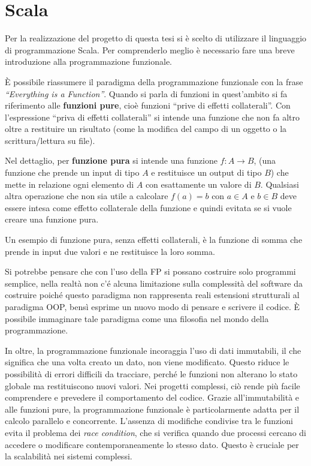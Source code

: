 \documentclass[12pt,a4paper,openright,twoside]{book}
\begin{document}
\section{Scala}

Per la realizzazione del progetto di questa tesi si è scelto di utilizzare il linguaggio di programmazione Scala. Per comprenderlo meglio è necessario fare una breve introduzione alla programmazione funzionale.

È possibile riassumere il paradigma della programmazione funzionale con la frase \textit{``Everything is a Function''}. Quando si parla di funzioni in quest'ambito si fa riferimento alle \textbf{funzioni pure}\cite{Hunt2018}, cioè funzioni ``prive di effetti collaterali''. Con l'espressione ``priva di effetti collaterali'' si intende una funzione che non fa altro oltre a restituire un risultato (come la modifica del campo di un oggetto o la scrittura/lettura su file).

\label{sec:fp}
Nel dettaglio, per \textbf{funzione pura} si intende una funzione $f:A\to B$, (una funzione che prende un input di tipo $A$ e restituisce un output di tipo $B$) che mette in relazione ogni elemento di $A$ con esattamente un valore di $B$. Qualsiasi altra operazione che non sia utile a calcolare $f(a)=b$ con $a\in A$ e $b\in B$ deve essere intesa come effetto collaterale della funzione e quindi evitata se si vuole creare una funzione pura.

Un esempio di funzione pura, senza effetti collaterali, è la funzione di somma che prende in input due valori e ne restituisce la loro somma. 

Si potrebbe pensare che con l'uso della \ac{FP} si possano costruire solo programmi semplice, nella realtà non c'é alcuna limitazione sulla complessità del software da costruire poiché questo paradigma non rappresenta reali estensioni strutturali al paradigma \ac{OOP}, bensì esprime un nuovo modo di pensare e scrivere il codice. È possibile immaginare tale paradigma come una filosofia nel mondo della programmazione.

In oltre, la programmazione funzionale incoraggia l'uso di dati immutabili, il che significa che una volta creato un dato, non viene modificato. Questo riduce le possibilità di errori difficili da tracciare, perché le funzioni non alterano lo stato globale ma restituiscono nuovi valori. Nei progetti complessi, ciò rende più facile comprendere e prevedere il comportamento del codice.  Grazie all'immutabilità e alle funzioni pure, la programmazione funzionale è particolarmente adatta per il calcolo parallelo e concorrente. L'assenza di modifiche condivise tra le funzioni evita il problema dei \textit{race condition}, che si verifica quando due processi cercano di accedere o modificare contemporaneamente lo stesso dato. Questo è cruciale per la scalabilità nei sistemi complessi.
\end{document}
